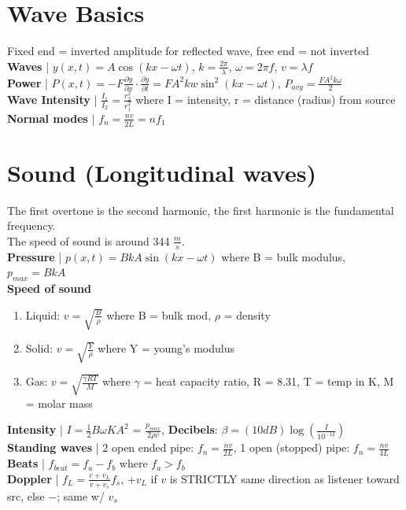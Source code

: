 \documentclass{article}
\begin{document}
\section{Wave Basics}
\vspace{-2mm}
Fixed end = inverted amplitude for reflected wave, free end = not inverted \\
\textbf{Waves} | $y(x, t) = A\cos{(kx - \omega t)}$,
    $k = \frac{2\pi}{\lambda}$,
    $\omega = 2\pi f$,
    $v = \lambda f$ \\
\textbf{Power} |
$P(x, t) = -F \frac{\partial y}{\partial x} \cdot \frac{\partial y}{\partial t} = FA^2kw\sin^2{(kx - \omega t)}$,
    $P_{avg} = \frac{FA^2k \omega}{2}$ \\
\textbf{Wave Intensity} | $\frac{I_1}{I_2} = \frac{r_2^2}{r_1^2}$ where I = intensity, r = distance (radius) from source \\
\textbf{Normal modes} | $f_n = \frac{nv}{2L} = nf_1$

\vspace{-5mm}
\section{Sound (Longitudinal waves)}
\vspace{-4mm}
The first overtone is the second harmonic, the first harmonic is the fundamental frequency. \\
The speed of sound is around 344 $\frac{m}{s}$. \\
\textbf{Pressure} | $p(x, t) = BkA\sin{(kx - \omega t)}$ where B = bulk modulus, $p_{max} = BkA$ \\
\textbf{Speed of sound}
\begin{enumerate}
    \vspace{-4mm}
    \item Liquid: $v = \sqrt{\frac{B}{\rho}}$ where B = bulk mod, $\rho$ = density
    \vspace{-3mm}
    \item Solid: $v = \sqrt{\frac{Y}{\rho}}$ where Y = young's modulus
    \vspace{-3mm}
    \item Gas: $v = \sqrt{\frac{\gamma RT}{M}}$ where $\gamma$ = heat capacity ratio, R = 8.31, T = temp in K, M = molar mass
\end{enumerate}
\vspace{-3mm}
\textbf{Intensity} | $I = \frac{1}{2}B \omega KA^2$ = $\frac{p_{max}}{2 \rho v}$,
    \textbf{Decibels}: $\beta = (10dB) \log{(\frac{I}{10^{-12}})}$ \\
\textbf{Standing waves} | 2 open ended pipe: $f_n = \frac{nv}{2L}$,
    1 open (stopped) pipe: $f_n = \frac{nv}{4L}$ \\
\textbf{Beats} | $f_{beat} = f_a - f_b$ where $f_a > f_b$ \\
\textbf{Doppler} | $f_L = \frac{v + v_L}{v + v_s} f_s$, $+v_L$ if $v$ is STRICTLY  same direction as listener toward src, else $-$; same w/ $v_s$ \\
\vspace{-5mm}
\end{document}
